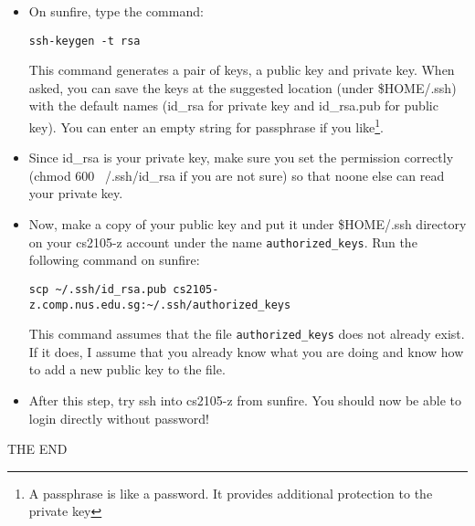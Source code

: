 \documentclass[a4paper,11pt]{exam}
\begin{document}
\begin{questions}
\begin{itemize}
	\item On sunfire, type the command:
\begin{Verbatim}
ssh-keygen -t rsa
\end{Verbatim}
This command generates a pair of keys, a public key and private key.  When asked, you can save the keys at the suggested location (under \$HOME/.ssh) with the default names (id\_rsa for private key and id\_rsa.pub for public key).  You can enter an empty string for passphrase if you like\footnote{A passphrase is like a password.  It provides additional protection to the private key}.
\item Since id\_rsa is your private key, make sure you set the permission correctly (chmod 600 ~/.ssh/id\_rsa if you are not sure) so that noone else can read your private key.
\item Now, make a copy of your public key and put it under \$HOME/.ssh directory on your cs2105-z account under the name \texttt{authorized\_keys}.  Run the following command on sunfire:
\begin{Verbatim}
scp ~/.ssh/id_rsa.pub cs2105-z.comp.nus.edu.sg:~/.ssh/authorized_keys
\end{Verbatim}
This command assumes that the file \texttt{authorized\_keys} does not already exist.  If it does, I assume that you already know what you are doing and know how to add a new public key to the file.
\item After this step, try ssh into cs2105-z from sunfire.  You should now be able to login directly without password!
\end{itemize}

\end{questions}

\vfill
\begin{center}
    \textsf{\Huge THE END}
\end{center}
\end{document}
